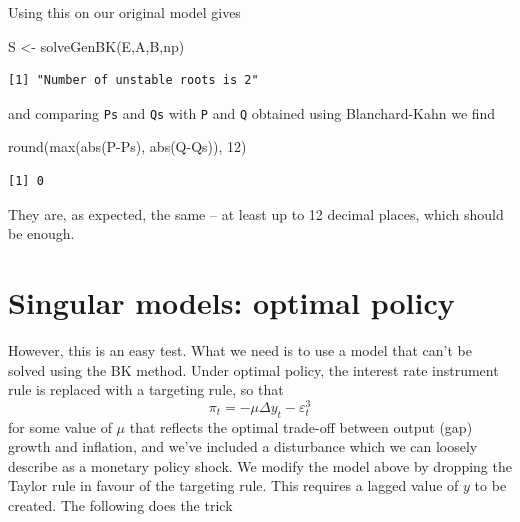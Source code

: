 \documentclass[
  letterpaper,
]{book}
\newenvironment{Shaded}{\begin{snugshade}}{\end{snugshade}}
\newcommand{\DecValTok}[1]{\textcolor[rgb]{0.68,0.00,0.00}{#1}}
\newcommand{\FunctionTok}[1]{\textcolor[rgb]{0.28,0.35,0.67}{#1}}
\newcommand{\NormalTok}[1]{\textcolor[rgb]{0.00,0.23,0.31}{#1}}
\newcommand{\OtherTok}[1]{\textcolor[rgb]{0.00,0.23,0.31}{#1}}
\newcommand{\SpecialCharTok}[1]{\textcolor[rgb]{0.37,0.37,0.37}{#1}}
\begin{document}
Using this on our original model gives

\begin{Shaded}
\begin{Highlighting}[]
\NormalTok{S  }\OtherTok{\textless{}{-}} \FunctionTok{solveGenBK}\NormalTok{(E,A,B,np)}
\end{Highlighting}
\end{Shaded}

\begin{verbatim}
[1] "Number of unstable roots is 2"
\end{verbatim}

\begin{Shaded}
\end{Shaded}

and comparing \texttt{Ps} and \texttt{Qs} with \texttt{P} and \texttt{Q}
obtained using Blanchard-Kahn we find

\begin{Shaded}
\begin{Highlighting}[]
\FunctionTok{round}\NormalTok{(}\FunctionTok{max}\NormalTok{(}\FunctionTok{abs}\NormalTok{(P}\SpecialCharTok{{-}}\NormalTok{Ps), }\FunctionTok{abs}\NormalTok{(Q}\SpecialCharTok{{-}}\NormalTok{Qs)), }\DecValTok{12}\NormalTok{)}
\end{Highlighting}
\end{Shaded}

\begin{verbatim}
[1] 0
\end{verbatim}

They are, as expected, the same -- at least up to 12 decimal places,
which should be enough.

\hypertarget{singular-models-optimal-policy}{%
\section{Singular models: optimal
policy}\label{singular-models-optimal-policy}}

However, this is an easy test. What we need is to use a model that can't
be solved using the BK method. Under
optimal policy, the interest rate instrument rule is replaced with a
targeting rule, so that \[
  \pi_t = -\mu \Delta y_t - \varepsilon^3_t
\] for some value of \(\mu\) that reflects the optimal trade-off between
output (gap) growth and inflation, and we've included a disturbance
which we can loosely describe as a monetary policy shock. We modify the
model above by dropping the Taylor rule in favour of
the targeting rule. This requires a lagged value of \(y\) to be created.
The following does the trick
\end{document}
